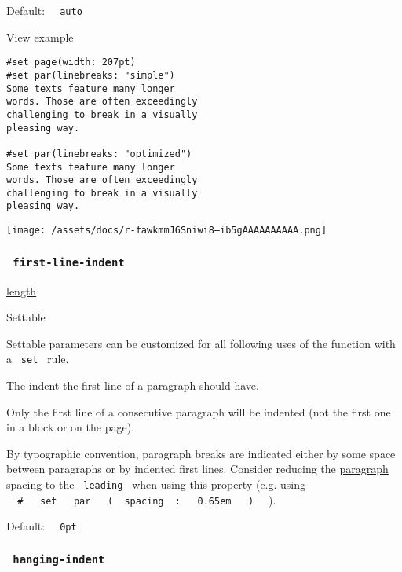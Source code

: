 Default: \texttt{\ }{\texttt{\ auto\ }}\texttt{\ }


View example

\begin{verbatim}
#set page(width: 207pt)
#set par(linebreaks: "simple")
Some texts feature many longer
words. Those are often exceedingly
challenging to break in a visually
pleasing way.

#set par(linebreaks: "optimized")
Some texts feature many longer
words. Those are often exceedingly
challenging to break in a visually
pleasing way.
\end{verbatim}

\texttt{[image: /assets/docs/r-fawkmmJ6Sniwi8--ib5gAAAAAAAAAA.png]}

\subsubsection{\texorpdfstring{\texttt{\ first-line-indent\ }}{ first-line-indent }}\label{parameters-first-line-indent}

\href{/docs/reference/layout/length/}{length}

{{ Settable }}

\label{parameters-first-line-indent-settable-tooltip}
Settable parameters can be customized for all following uses of the
function with a \texttt{\ set\ } rule.

The indent the first line of a paragraph should have.

Only the first line of a consecutive paragraph will be indented (not the
first one in a block or on the page).

By typographic convention, paragraph breaks are indicated either by some
space between paragraphs or by indented first lines. Consider reducing
the \href{/docs/reference/layout/block/\#parameters-spacing}{paragraph
spacing} to the
\href{/docs/reference/model/par/\#parameters-leading}{\texttt{\ leading\ }}
when using this property (e.g. using
\texttt{\ }{\texttt{\ \#\ }}\texttt{\ }{\texttt{\ set\ }}\texttt{\ }{\texttt{\ par\ }}\texttt{\ }{\texttt{\ (\ }}\texttt{\ spacing\ }{\texttt{\ :\ }}\texttt{\ }{\texttt{\ 0.65em\ }}\texttt{\ }{\texttt{\ )\ }}\texttt{\ }
).

Default: \texttt{\ }{\texttt{\ 0pt\ }}\texttt{\ }

\subsubsection{\texorpdfstring{\texttt{\ hanging-indent\ }}{ hanging-indent }}\label{parameters-hanging-indent}

